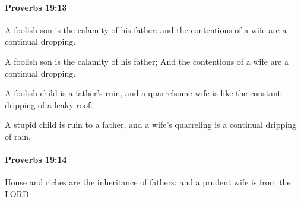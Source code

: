 		\paragraph{Proverbs 19:13} %
			\label{PROVERBS-19-13}

			A foolish son is the calamity of his father: and the contentions of a wife are a continual dropping.

			\begin{versebox}
					\item[BHS] 
					\item[ASV] A foolish son is the calamity of his father; And the contentions of a wife are a continual dropping.
					\item[NIV] A foolish child is a father’s ruin, and a quarrelsome wife is like the constant dripping of a leaky roof.
					\item[NRSV] A stupid child is ruin to a father, and a wife’s quarreling is a continual dripping of rain.
			\end{versebox}

		\paragraph{Proverbs 19:14} %
			\label{PROVERBS-19-14}

			House and riches are the inheritance of fathers: and a prudent wife is from the LORD.


